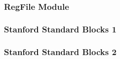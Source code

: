 \documentclass[11pt]{article}
\begin{document}
\begin{description}
\subsubsection{RegFile Module}


\subsubsection{Stanford Standard Blocks 1}


\subsubsection{Stanford Standard Blocks 2}



\end{description}
\end{document}
